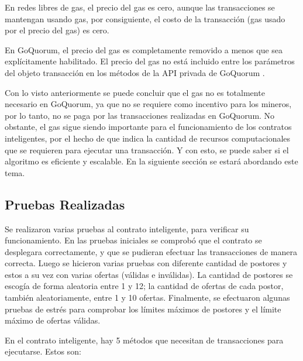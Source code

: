       En redes libres de gas, el precio del gas es cero, aunque las transacciones se mantengan usando gas,
      por consiguiente, el costo de la transacción (gas usado por el precio del gas) es cero.


      En GoQuorum, el precio del gas es completamente removido a menos que sea explícitamente habilitado.
      El precio del gas no está incluido entre los parámetros del objeto transacción en los métodos de la
      API privada de GoQuorum \parencite{consensysfreegas}.


      Con lo visto anteriormente se puede concluir que el gas no es totalmente necesario en GoQuorum, ya 
      que no se requiere como incentivo para los mineros, por lo tanto, no se paga por las transacciones
      realizadas en GoQuorum. No obstante, el gas sigue siendo importante para el funcionamiento de
      los contratos inteligentes, por el hecho de que indica la cantidad de recursos computacionales que se requieren para ejecutar una transacción. Y con esto, se puede saber si el algoritmo es eficiente y  escalable. En la siguiente sección se estará abordando este tema.

      \subsection{Pruebas Realizadas}
      Se realizaron varias pruebas al contrato inteligente, para verificar su funcionamiento. En las pruebas 
      iniciales se comprobó que el contrato se desplegara correctamente, y que se pudieran efectuar las 
      transacciones de manera correcta. Luego se hicieron varias pruebas con diferente cantidad de 
      postores y estos a su vez con varias ofertas (válidas e inválidas). La cantidad de postores se 
      escogía de forma aleatoria entre 1 y 12; la cantidad de ofertas de cada postor, también aleatoriamente, entre 1 y 10 ofertas. Finalmente, se efectuaron algunas pruebas de estrés para comprobar los límites máximos de postores y el límite máximo de ofertas válidas.

      En el contrato inteligente, hay 5 métodos que necesitan de transacciones para ejecutarse. Estos son:

